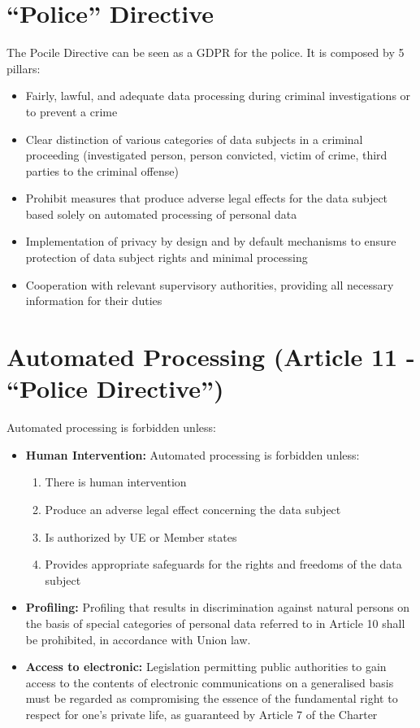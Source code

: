 \section{“Police” Directive}

The Pocile Directive can be seen as a GDPR for the police. It is composed by 5 pillars:

\begin{itemize}[itemsep=0pt]
    \item Fairly, lawful, and adequate data processing during criminal investigations or to prevent a crime
    \item Clear distinction of various categories of data subjects in a criminal proceeding (investigated person, person convicted, victim of crime, third parties to the criminal offense)
    \item Prohibit measures that produce adverse legal effects for the data subject based solely on automated processing of personal data
    \item Implementation of privacy by design and by default mechanisms to ensure protection of data subject rights and minimal processing
    \item Cooperation with relevant supervisory authorities, providing all necessary information for their duties
\end{itemize}

\section{Automated Processing (Article 11 - “Police Directive”)}

Automated processing is forbidden unless:
\begin{itemize}[itemsep=0pt]
    \item \textbf{Human Intervention:} Automated processing is forbidden unless:
    \begin{enumerate}[itemsep=0pt,  label=\roman*.]
        \item There is human intervention
        \item Produce an adverse legal effect concerning the data subject
        \item Is authorized by UE or Member states
        \item Provides appropriate safeguards for the rights and freedoms of the data subject
    \end{enumerate}
    \item \textbf{Profiling:} Profiling that results in discrimination against natural persons on the basis of special categories of personal data referred to in Article 10 shall be prohibited, in accordance with Union law.
    
    \item \textbf{Access to electronic:} Legislation permitting public authorities to gain access to the contents of electronic communications on a generalised basis must be regarded as compromising the essence of the fundamental right to respect for one’s private life, as guaranteed by Article 7 of the Charter
\end{itemize}

